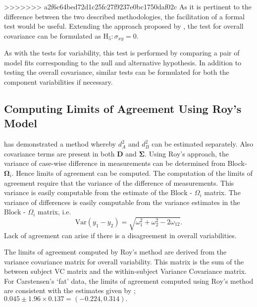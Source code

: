 \documentclass[12pt, a4paper]{report}
\theoremstyle{plain}
\theoremstyle{definition}
\theoremstyle{remark}
\begin{document}
>>>>>>> a2f6c64bed72d1c25fc27f9237e0bc1750daf02c
As it is pertinent to the difference between the two described methodologies, the facilitation of a formal test would be useful. Extending the approach proposed by \citet{ARoy2009}, the test for overall covariance can be formulated as $\operatorname{H_5} : \sigma_{xy} = 0$.

As with the tests for variability, this test is performed by comparing a pair of model fits corresponding to the null and alternative hypothesis. In addition to testing the overall covariance, similar tests can be formulated for both the component variabilities if necessary.



\subsection{Computing Limits of Agreement Using Roy's Model}
\citet{ARoy2009} has demonstrated a method whereby $d^2_{A}$ and $d^2_{B}$ can be estimated separately. Also covariance terms are present in both $\boldsymbol{D}$ and $\boldsymbol{\Sigma}$. Using Roy's approach, the variance of case-wise difference in measurements can be determined from Block-$\boldsymbol{\Omega}_{i}$. Hence limits of agreement can be computed. The computation of the limits of agreement require that the variance of the difference of measurements. This variance is easily computable from the estimate of the ${\mbox{Block - } \Omega_{i}}$ matrix.
The variance of differences is easily computable from the variance estimates in the ${\mbox{Block - } \Omega_{i}}$ matrix, i.e.
\begin{equation}
\mathrm{Var}(y_1 - y_2) = \sqrt{ \omega^2_1 + \omega^2_2 - 2\omega_{12}}.
\label{Roy-LOA}
\end{equation}
Lack of agreement can arise if there is a disagreement in overall variabilities.

The limits of agreement computed by Roy's method are derived from the variance covariance matrix for overall variability.
This matrix is the sum of the between subject VC matrix and the within-subject Variance Covariance matrix.
For Carstensen's `fat' data, the limits of agreement computed using Roy's
method are consistent with the estimates given by \citet{BXC2008}; $0.045  \pm 1.96 \times  0.137 = (-0.224,  0.314).$
\end{document}
